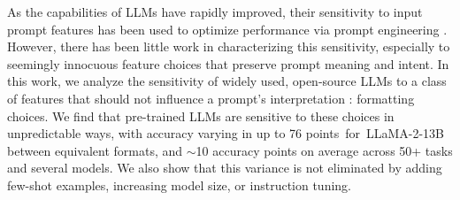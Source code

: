 As the capabilities of LLMs have rapidly improved, their sensitivity to input prompt features has been used to optimize performance via prompt engineering \citep{white2023prompt}. 
However, there has been little work in characterizing this sensitivity, especially to seemingly innocuous feature choices that preserve prompt meaning and intent.
In this work, we analyze the sensitivity of widely used, open-source LLMs to a class of features that should not influence a prompt's interpretation%
: formatting choices.
We find that pre-trained LLMs are sensitive to these choices in unpredictable ways, with accuracy varying in up to 76 points~for~\mbox{LLaMA-2-13B} between equivalent formats, and $\sim$10 accuracy points on average across 50+ tasks and several models. %
We also show that this variance is not eliminated by adding few-shot examples, increasing model size, or instruction tuning.

